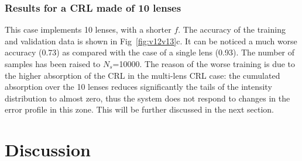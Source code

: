 \documentclass{iucr}
\newcommand{\todo}[1]{{\color{red}[TODO: "#1'']}}
\newcommand{\inred}[1]{{\color{red}#1}}
\begin{document}


 

    




 \subsubsection{Results for a CRL made of 10 lenses}
 This case implements 10 lenses, with a shorter $f$. The accuracy of the training and validation data is shown in 
 Fig~\ref{fig:v12v13}c.
 It can be noticed a much worse accuracy (0.73) as compared with the case of a single lens (0.93). The number of samples has been raised to $N_s$=10000. The reason of the worse training is due to the higher absorption of the CRL in the multi-lens CRL case: the cumulated absorption over the 10 lenses reduces significantly the tails of the intensity distribution to almost zero, thus the system does not respond to changes in the error profile in this zone. This will be further discussed in the next section.



\section{Discussion}\label{sec:discussion}
\end{document}
